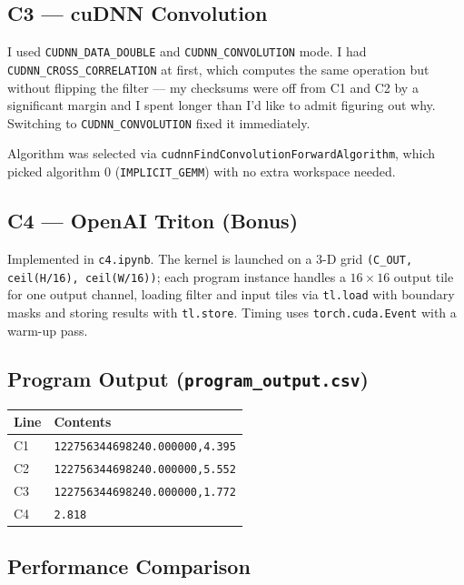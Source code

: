 \documentclass[11pt,letterpaper]{article}
\begin{document}
\subsection{C3 --- cuDNN Convolution}

I used \texttt{CUDNN\_DATA\_DOUBLE} and \texttt{CUDNN\_CONVOLUTION} mode.
I had \texttt{CUDNN\_CROSS\_CORRELATION} at first, which computes the same
operation but without flipping the filter --- my checksums were off from C1 and C2
by a significant margin and I spent longer than I'd like to admit figuring out why.
Switching to \texttt{CUDNN\_CONVOLUTION} fixed it immediately.

Algorithm was selected via \texttt{cudnnFindConvolutionForwardAlgorithm}, which
picked algorithm 0 (\texttt{IMPLICIT\_GEMM}) with no extra workspace needed.

\subsection{C4 --- OpenAI Triton (Bonus)}

Implemented in \texttt{c4.ipynb}. The kernel is launched on a 3-D grid
\texttt{(C\_OUT, ceil(H/16), ceil(W/16))}; each program instance handles
a $16\times16$ output tile for one output channel, loading filter and input
tiles via \texttt{tl.load} with boundary masks and storing results with
\texttt{tl.store}. Timing uses \texttt{torch.cuda.Event} with a warm-up pass.

\subsection{Program Output (\texttt{program\_output.csv})}

\begin{center}
\begin{tabular}{ll}
\toprule
\textbf{Line} & \textbf{Contents} \\
\midrule
C1 & \texttt{122756344698240.000000,4.395} \\
C2 & \texttt{122756344698240.000000,5.552} \\
C3 & \texttt{122756344698240.000000,1.772} \\
C4 & \texttt{2.818} \\
\bottomrule
\end{tabular}
\end{center}

\subsection{Performance Comparison}
\end{document}
